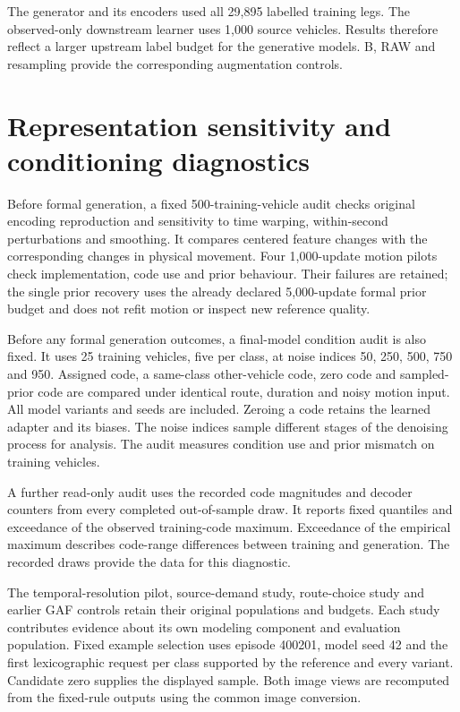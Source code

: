The generator and its encoders used all 29,895 labelled training legs. The observed-only downstream learner uses 1,000 source vehicles. Results therefore reflect a larger upstream label budget for the generative models. B, RAW and resampling provide the corresponding augmentation controls.

\section{Representation sensitivity and conditioning diagnostics}
\label{sec:expanded-protocol}
Before formal generation, a fixed 500-training-vehicle audit checks original encoding reproduction and sensitivity to time warping, within-second perturbations and smoothing. It compares centered feature changes with the corresponding changes in physical movement. Four 1,000-update motion pilots check implementation, code use and prior behaviour. Their failures are retained; the single prior recovery uses the already declared 5,000-update formal prior budget and does not refit motion or inspect new reference quality.

Before any formal generation outcomes, a final-model condition audit is also fixed. It uses 25 training vehicles, five per class, at noise indices 50, 250, 500, 750 and 950. Assigned code, a same-class other-vehicle code, zero code and sampled-prior code are compared under identical route, duration and noisy motion input. All model variants and seeds are included. Zeroing a code retains the learned adapter and its biases. The noise indices sample different stages of the denoising process for analysis. The audit measures condition use and prior mismatch on training vehicles.

A further read-only audit uses the recorded code magnitudes and decoder counters from every completed out-of-sample draw. It reports fixed quantiles and exceedance of the observed training-code maximum. Exceedance of the empirical maximum describes code-range differences between training and generation. The recorded draws provide the data for this diagnostic.

The temporal-resolution pilot, source-demand study, route-choice study and earlier GAF controls retain their original populations and budgets. Each study contributes evidence about its own modeling component and evaluation population. Fixed example selection uses episode 400201, model seed 42 and the first lexicographic request per class supported by the reference and every variant. Candidate zero supplies the displayed sample. Both image views are recomputed from the fixed-rule outputs using the common image conversion.
